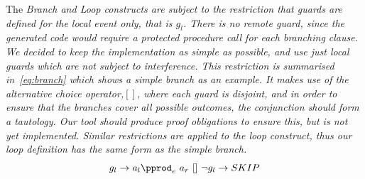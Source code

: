 The \it Branch \rm and \it Loop \rm constructs are subject to the restriction that guards are defined for the local event only, that is $g_l$. There is no remote guard, since the generated code would require a protected procedure call for each branching clause. We decided to keep the implementation as simple as possible, and use just local guards which are not subject to interference. This restriction is summarised in~\eqref{eq:branch} which shows a simple branch as an example. It makes use of the alternative choice operator,$[]$, where each guard is disjoint, and  in order to ensure that the branches cover all possible outcomes, the conjunction should form a tautology. Our tool should produce proof obligations to ensure this, but is not yet implemented. Similar restrictions are applied to the loop construct, thus our loop definition has the same form as the simple branch.
%
\begin{equation}
g_l \rightarrow a_l \pprod_e~a_r~ []~ \lnot g_l \rightarrow SKIP
\label{eq:branch}
\end{equation}
%
%
